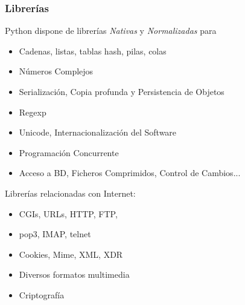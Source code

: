\documentclass[ucs]{beamer}
\begin{document}








\begin{frame}[fragile]
\frametitle{Librerías}
Python dispone de librerías \emph{Nativas} y \emph{Normalizadas} para
  \begin{itemize}
  \item Cadenas, listas, tablas hash, pilas, colas
  \item Números Complejos
  \item Serialización, Copia profunda y Persistencia de Objetos
  \item Regexp
  \item Unicode, Internacionalización del Software
  \item Programación Concurrente
  \item Acceso a BD, Ficheros Comprimidos, Control de Cambios...
  \end{itemize}
\end{frame}


\begin{frame}[fragile]
Librerías relacionadas con Internet:
  \begin{itemize}
  \item CGIs, URLs, HTTP, FTP, 
  \item pop3, IMAP, telnet
  \item Cookies, Mime, XML, XDR
  \item Diversos formatos multimedia 
  \item Criptografía 
  \end{itemize}
\end{frame}
\end{document}
